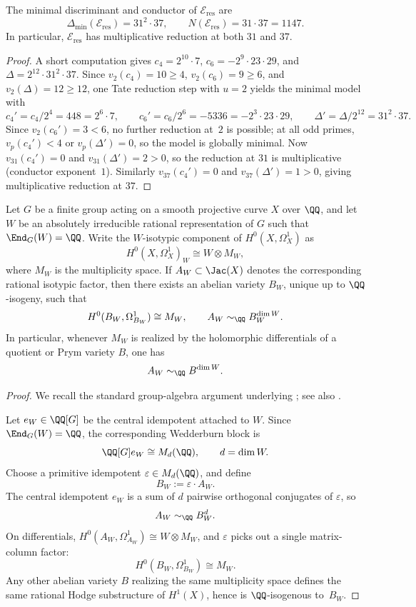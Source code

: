 \begin{proposition}\label{prop:eres-conductor}
The minimal discriminant and conductor of \(\mathcal E_{\mathrm{res}}\) are
\[
\Delta_{\min}(\mathcal E_{\mathrm{res}})=31^2\cdot 37,
\qquad
N(\mathcal E_{\mathrm{res}})=31\cdot 37=1147.
\]
In particular, \(\mathcal E_{\mathrm{res}}\) has multiplicative reduction at both \(31\) and \(37\).
\end{proposition}

\begin{proof}
A short computation gives \(c_4=2^{10}\cdot 7\), \(c_6=-2^9\cdot 23\cdot 29\), and \(\Delta=2^{12}\cdot 31^2\cdot 37\).
Since \(v_2(c_4)=10\ge 4\), \(v_2(c_6)=9\ge 6\), and \(v_2(\Delta)=12\ge 12\), one Tate reduction step with \(u=2\) yields the minimal model with
\[
c_4'=c_4/2^4=448=2^6\cdot 7,
\qquad
c_6'=c_6/2^6=-5336=-2^3\cdot 23\cdot 29,
\qquad
\Delta'=\Delta/2^{12}=31^2\cdot 37.
\]
Since \(v_2(c_6')=3<6\), no further reduction at~\(2\) is possible; at all odd primes, \(v_p(c_4')<4\) or \(v_p(\Delta')=0\), so the model is globally minimal.
Now \(v_{31}(c_4')=0\) and \(v_{31}(\Delta')=2>0\), so the reduction at \(31\) is multiplicative (conductor exponent~\(1\)).
Similarly \(v_{37}(c_4')=0\) and \(v_{37}(\Delta')=1>0\), giving multiplicative reduction at \(37\).
\end{proof}

\begin{proposition}\label{prop:extract}
Let \(G\) be a finite group acting on a smooth projective curve \(X\) over \(\QQ\), and let \(W\) be an absolutely irreducible rational representation of \(G\) such that \(\End_G(W)=\QQ\). Write the \(W\)-isotypic component of \(H^0(X,\Omega_X^1)\) as
\[
H^0(X,\Omega_X^1)_W\cong W\otimes M_W,
\]
where \(M_W\) is the multiplicity space.
If \(A_W\subset \Jac(X)\) denotes the corresponding rational isotypic factor, then there exists an abelian variety \(B_W\), unique up to \(\QQ\)-isogeny, such that
\[
H^0(B_W,\Omega_{B_W}^1)\cong M_W,
\qquad
A_W\sim_{\QQ} B_W^{\dim W}.
\]
In particular, whenever \(M_W\) is realized by the holomorphic differentials of a quotient or Prym variety \(B\), one has
\[
A_W\sim_{\QQ} B^{\dim W}.
\]
\end{proposition}

\begin{proof}
We recall the standard group-algebra argument underlying \cite{KaniRosen1989}; see also \cite[Section~13.4]{BirkenhakeLange2004}.

Let \(e_W\in \QQ[G]\) be the central idempotent attached to \(W\). Since \(\End_G(W)=\QQ\), the corresponding Wedderburn block is
\[
\QQ[G]e_W\cong M_d(\QQ),\qquad d=\dim W.
\]
Choose a primitive idempotent \(\varepsilon\in M_d(\QQ)\), and define
\[
B_W:=\varepsilon\cdot A_W.
\]
The central idempotent \(e_W\) is a sum of \(d\) pairwise orthogonal conjugates of \(\varepsilon\), so
\[
A_W\sim_{\QQ} B_W^d.
\]
On differentials, \(H^0(A_W,\Omega_{A_W}^1)\cong W\otimes M_W\), and \(\varepsilon\) picks out a single matrix-column factor:
\[
H^0(B_W,\Omega_{B_W}^1)\cong M_W.
\]
Any other abelian variety \(B\) realizing the same multiplicity space defines the same rational Hodge substructure of \(H^1(X)\), hence is \(\QQ\)-isogenous to~\(B_W\).
\end{proof}

